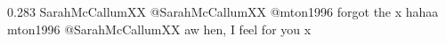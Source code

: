 %
%
%
%
%

{0.283}
{\joinNameTweet
{SarahMcCallumXX}
{@SarahMcCallumXX @mton1996 forgot the x hahaa}}
{\joinNameTweet
{mton1996}
{@SarahMcCallumXX aw hen, I feel for you x}}

%
%
%
%
%
%
%

